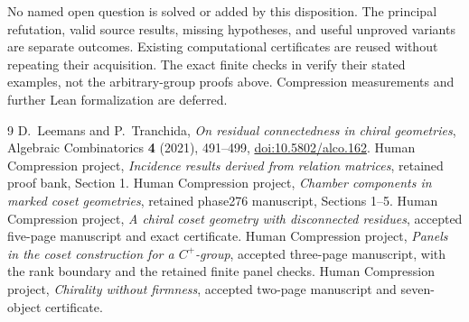\documentclass[11pt]{article}
\begin{document}
No named open question is solved or added by this disposition.
The principal refutation, valid source results, missing hypotheses,
and useful unproved variants are separate outcomes. Existing
computational certificates are reused without repeating their
acquisition. The exact finite checks in \cite{PB,CF} verify their
stated examples, not the arbitrary-group proofs above. Compression
measurements and further Lean formalization are deferred.

\begin{thebibliography}{9}
 D.~Leemans and P.~Tranchida,
\emph{On residual connectedness in chiral geometries},
Algebraic Combinatorics \textbf{4} (2021), 491--499,
\href{https://doi.org/10.5802/alco.162}{doi:10.5802/alco.162}.
 Human Compression project,
\emph{Incidence results derived from relation matrices},
retained proof bank, Section 1.
 Human Compression project,
\emph{Chamber components in marked coset geometries},
retained phase276 manuscript, Sections 1--5.
 Human Compression project,
\emph{A chiral coset geometry with disconnected residues},
accepted five-page manuscript and exact certificate.
 Human Compression project,
\emph{Panels in the coset construction for a $C^+$-group},
accepted three-page manuscript, with the rank boundary and the
retained finite panel checks.
 Human Compression project,
\emph{Chirality without firmness}, accepted two-page manuscript
and seven-object certificate.
\end{thebibliography}
\end{document}
